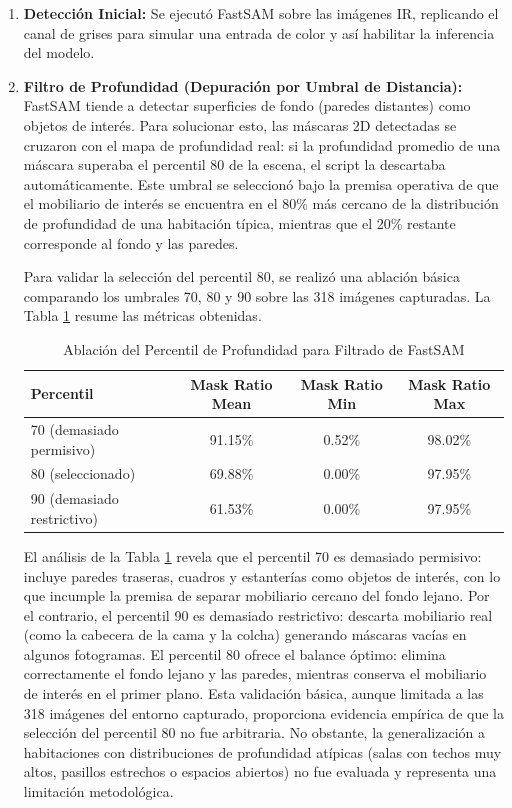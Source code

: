 \documentclass[12pt, a4, twoside, openany]{report}
\begin{document}
\begin{enumerate}
    \item \textbf{Detección Inicial:} Se ejecutó FastSAM sobre las imágenes IR, replicando el canal de grises para simular una entrada de color y así habilitar la inferencia del modelo.
    \item \textbf{Filtro de Profundidad (Depuración por Umbral de Distancia):} FastSAM tiende a detectar superficies de fondo (paredes distantes) como objetos de interés. Para solucionar esto, las máscaras 2D detectadas se cruzaron con el mapa de profundidad real: si la profundidad promedio de una máscara superaba el percentil 80 de la escena, el script la descartaba automáticamente. Este umbral se seleccionó bajo la premisa operativa de que el mobiliario de interés se encuentra en el 80\% más cercano de la distribución de profundidad de una habitación típica, mientras que el 20\% restante corresponde al fondo y las paredes.
    
    Para validar la selección del percentil 80, se realizó una ablación básica comparando los umbrales 70, 80 y 90 sobre las 318 imágenes capturadas. La Tabla \ref{tab:ablacion_percentil} resume las métricas obtenidas.
    
    \begin{table}[H]
    \centering
    \caption{Ablación del Percentil de Profundidad para Filtrado de FastSAM}
    \label{tab:ablacion_percentil}
    \begin{tabular}{lccc}
    \toprule
    \textbf{Percentil} & \textbf{Mask Ratio Mean} & \textbf{Mask Ratio Min} & \textbf{Mask Ratio Max} \\
    \midrule
    70 (demasiado permisivo) & 91.15\% & 0.52\% & 98.02\% \\
    80 (seleccionado) & 69.88\% & 0.00\% & 97.95\% \\
    90 (demasiado restrictivo) & 61.53\% & 0.00\% & 97.95\% \\
    \bottomrule
    \end{tabular}
    \end{table}
    
    El análisis de la Tabla \ref{tab:ablacion_percentil} revela que el percentil 70 es demasiado permisivo: incluye paredes traseras, cuadros y estanterías como objetos de interés, con lo que incumple la premisa de separar mobiliario cercano del fondo lejano. Por el contrario, el percentil 90 es demasiado restrictivo: descarta mobiliario real (como la cabecera de la cama y la colcha) generando máscaras vacías en algunos fotogramas. El percentil 80 ofrece el balance óptimo: elimina correctamente el fondo lejano y las paredes, mientras conserva el mobiliario de interés en el primer plano. Esta validación básica, aunque limitada a las 318 imágenes del entorno capturado, proporciona evidencia empírica de que la selección del percentil 80 no fue arbitraria. No obstante, la generalización a habitaciones con distribuciones de profundidad atípicas (salas con techos muy altos, pasillos estrechos o espacios abiertos) no fue evaluada y representa una limitación metodológica.


\end{enumerate}
\end{document}
